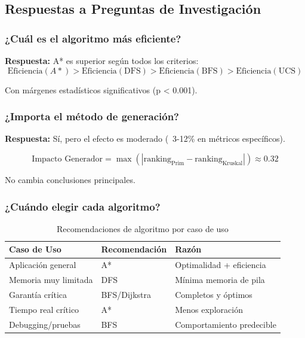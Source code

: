 \documentclass[12pt,a4paper]{article}
\begin{document}
\subsection{Respuestas a Preguntas de Investigación}

\subsubsection{¿Cuál es el algoritmo más eficiente?}

\textbf{Respuesta:} A* es superior según todos los criterios:
\begin{equation}
    \text{Eficiencia}(A*) > \text{Eficiencia}(\text{DFS}) > \text{Eficiencia}(\text{BFS}) > \text{Eficiencia}(\text{UCS})
\end{equation}

Con márgenes estadísticos significativos (p < 0.001).

\subsubsection{¿Importa el método de generación?}

\textbf{Respuesta:} Sí, pero el efecto es moderado (~3-12\% en métricos específicos).

\begin{equation}
    \text{Impacto Generador} = \max(|\text{ranking}_{\text{Prim}} - \text{ranking}_{\text{Kruskal}}|) \approx 0.32
\end{equation}

No cambia conclusiones principales.

\subsubsection{¿Cuándo elegir cada algoritmo?}

\begin{table}[H]
\centering
\caption{Recomendaciones de algoritmo por caso de uso}
\begin{tabular}{|p{4cm}|p{6cm}|p{3cm}|}
\hline
\textbf{Caso de Uso} & \textbf{Recomendación} & \textbf{Razón} \\
\hline
Aplicación general & A* & Optimalidad + eficiencia \\
\hline
Memoria muy limitada & DFS & Mínima memoria de pila \\
\hline
Garantía crítica & BFS/Dijkstra & Completos y óptimos \\
\hline
Tiempo real crítico & A* & Menos exploración \\
\hline
Debugging/pruebas & BFS & Comportamiento predecible \\
\hline
\end{tabular}
\end{table}
\end{document}
